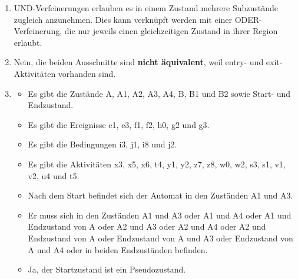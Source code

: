 \documentclass[a4paper, 12pt, margins=2.5cm]{homework}
\begin{document}
  \begin{problem}
    
  \end{problem}
  \begin{solution} \hfill
    \begin{enumerate}[label=\alph*)]\itemsep0pt
      \item UND-Verfeinerungen erlauben es in einem Zustand mehrere Subzustände
            zugleich anzunehmen. Dies kann verknüpft werden mit einer ODER-Verfeinerung,
            die nur jeweils einen gleichzeitigen Zustand in ihrer Region erlaubt.

      \item Nein, die beiden Ausschnitte sind \textbf{nicht äquivalent}, weil 
            entry- und exit-Aktivitäten vorhanden sind.
      \item
        \begin{itemize}
          \item Es gibt die Zustände A, A1, A2, A3, A4, B, B1 und B2 sowie Start-
                und Endzustand.
          \item Es gibt die Ereignisse e1, e3, f1, f2, h0, g2 und g3.
          \item Es gibt die Bedingungen i3, j1, i8 und j2.
          \item Es gibt die Aktivitäten x3, x5, x6, t4, y1, y2, z7, z8, w0, w2, s3,
                s1, v1, v2, u4 und t5.
          \item Nach dem Start befindet sich der Automat in den Zuständen A1 und A3.
          \item Er muss sich in den Zuständen A1 und A3 oder A1 und A4 oder A1 und 
                Endzustand von A oder A2 und A3 oder A2 und A4 oder A2 und Endzustand
                von A oder Endzustand von A und A3 oder Endzustand von A und A4 oder
                in beiden Endzuständen befinden.
          \item Ja, der Startzustand ist ein Pseudozustand.
        \end{itemize}
    \end{enumerate}
  \end{solution}
\end{document}
